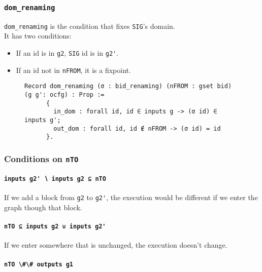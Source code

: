 \documentclass[11pt]{article}
\newcommand{\inlinecoq}[1]{\mbox{\lstinline[style=customcoq,columns=fixed,basewidth=.48em]{#1}}}
\newcommand{\ilc}[1]{\inlinecoq{#1}}
\begin{document}
\subsubsection{\ilc{dom_renaming}}

\ilc{dom_renaming} is the condition that fixes\; \ilc{SIG}'s domain.\\
It has two conditions:\begin{itemize}
  \item If an id is in \ilc{g2}, \;\ilc{SIG} id is in \ilc{g2'}.
  \item If an id not in \ilc{nFROM}, it is a fixpoint.
\end{itemize}

\begin{figure}[H]
  \begin{lstlisting}[style=customcoq,basicstyle=\small\ttfamily]
    Record dom_renaming (σ : bid_renaming) (nFROM : gset bid) (g g': ocfg) : Prop :=
      {
        in_dom : forall id, id ∈ inputs g -> (σ id) ∈ inputs g';
        out_dom : forall id, id ∉ nFROM -> (σ id) = id
      }.
  \end{lstlisting}
\end{figure}

\subsubsection{Conditions on \ilc{nTO}}

\paragraph{\ilc{inputs g2' ∖ inputs g2 ⊆ nTO}}

    

If we add a block from \ilc{g2} to \ilc{g2'}, the execution would be different if we enter the graph though that block.

\paragraph{\ilc{nTO ⊆ inputs g2 ∪ inputs g2'}}

If we enter somewhere that is unchanged, the execution doesn't change.

\paragraph{\ilc{nTO \#\# outputs g1}}
\end{document}
